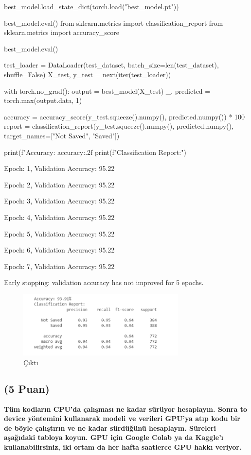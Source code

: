 \documentclass[11pt]{article}
\begin{document}
\begin{python}
best_model.load_state_dict(torch.load("best_model.pt"))

best_model.eval()
from sklearn.metrics import classification_report
from sklearn.metrics import accuracy_score

best_model.eval()

test_loader = DataLoader(test_dataset, batch_size=len(test_dataset), shuffle=False)
X_test, y_test = next(iter(test_loader))

with torch.no_grad():
    output = best_model(X_test)
    _, predicted = torch.max(output.data, 1)

accuracy = accuracy_score(y_test.squeeze().numpy(), predicted.numpy()) * 100
report = classification_report(y_test.squeeze().numpy(), predicted.numpy(), target_names=["Not Saved", "Saved"])

print(f"Accuracy: {accuracy:.2f}%
print(f"Classification Report:")

\end{python}
Epoch: 1, Validation Accuracy: 95.22%

Epoch: 2, Validation Accuracy: 95.22%

Epoch: 3, Validation Accuracy: 95.22%

Epoch: 4, Validation Accuracy: 95.22%

Epoch: 5, Validation Accuracy: 95.22%

Epoch: 6, Validation Accuracy: 95.22%

Epoch: 7, Validation Accuracy: 95.22%

Early stopping: validation accuracy has not improved for 5 epochs.

\begin{figure}[ht!]
    \centering
    \includegraphics[width=0.75\textwidth]{ysa2.png}
    \caption{Çıktı }
    \label{fig:my_pic}
\end{figure}



\subsection{(5 Puan)} \textbf{Tüm kodların CPU'da çalışması ne kadar sürüyor hesaplayın. Sonra to device yöntemini kullanarak modeli ve verileri GPU'ya atıp kodu bir de böyle çalıştırın ve ne kadar sürdüğünü hesaplayın. Süreleri aşağıdaki tabloya koyun. GPU için Google Colab ya da Kaggle'ı kullanabilirsiniz, iki ortam da her hafta saatlerce GPU hakkı veriyor.}
\end{document}
